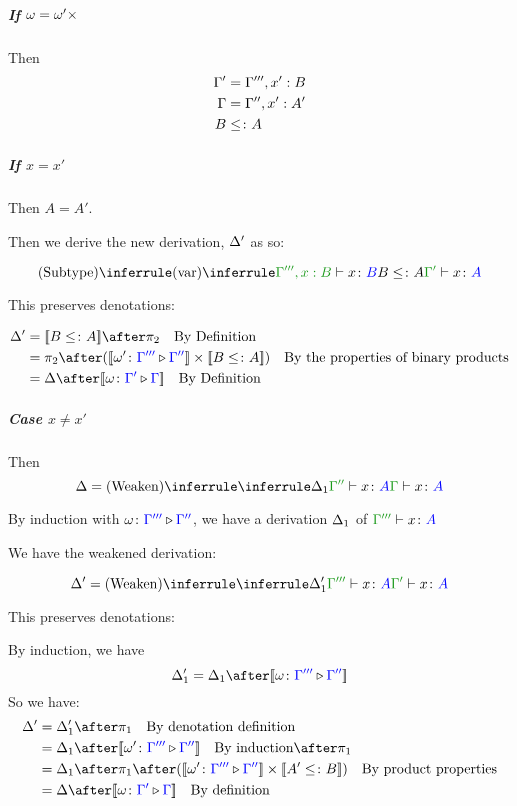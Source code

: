 \documentclass{report}
\begin{document}
    \subparagraph{If $\omega = \omega'\times$} 
    Then 
    \begin{align}
        \Gamma' & = \Gamma''', x': B\\
        \Gamma &= \Gamma'', x': A'\\
        B & \leq\colon A
    \end{align}

    \subparagraph{If $x = x'$}

    Then $A = A'$.

    Then we derive the new derivation, $\Delta'$ as so:

    \begin{equation}
        \ntreeruleII{Subtype}{
            \ntreeruleI{var}{}{\typerelation{\G''', x: B}{x}{B}}
            }{
            B \subtype A
        }{
            \typerelation{\G'}{x}{A}
        }
    \end{equation}

    This preserves denotations:

    \begin{align}
        \D' & = \deno{B\subtype A}\after\pp\qt{By Definition} \\
         & = \pp\after (\deno{\wrel{\w'}{\G'''}{\G''}}\times \deno{B\subtype A}) \qt{By the properties of binary products}\\
         & = \D\after\deno{\wrel{\w}{\G'}{\G}}\qt{By Definition}
    \end{align}

    \subparagraph{Case $x \neq x'$}
    Then 
    \begin{equation}
        \D = \ntreeruleI{Weaken}{\treeruleI{\D_1}{\typerelation{\G''}{x}{A}}}{\gtyperelation{x}{A}}
    \end{equation}

    By induction with $\omega \colon {\color{blue}\Gamma'''} \triangleright {\color {blue} \Gamma''}$,
     we have a derivation $\Delta_1$ of $\typerelation{\G'''}{x}{A}$

    We have the weakened derivation:

    \begin{equation}
        \D' = \ntreeruleI{Weaken}{\treeruleI{\D_1'}{\typerelation{\G'''}{x}{A}}}{\typerelation{\G'}{x}{A}}
    \end{equation}

    This preserves denotations:

    By induction, we have
    \begin{equation}
        \D_1' = \D_1 \after \deno{\wrel{\w}{\G'''}{\G''}}
    \end{equation}
    So we have:
    \begin{align}
        \D' &= \D_1' \after \p\qt{By denotation definition}\\
        & = \D_1\after\deno{\wrel{\w'}{\G'''}{\G''}}\qt{By induction}\after\p \\
        & = \D_1\after\p\after(\deno{\wrel{\w'}{\G'''}{\G''}}\times\deno{A' \subtype B})\qt{By product properties}\\
        & = \D\after\deno{\wrel{\w}{\G'}{\G}}\qt{By definition}
    \end{align}
\end{document}
